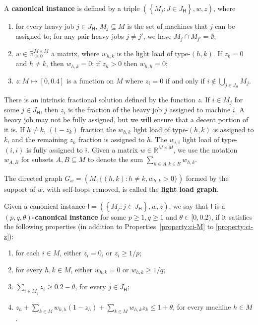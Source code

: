 \documentclass[11pt]{article}
\newenvironment{definition}{\begin{Definition}}{\end{Definition}}
\newtheorem{definition}[lemma]{Definition}
\newcounter{prop}
\newenvironment{properties}
{
\addtocounter{prop}{1}
\begin{enumerate}[labelindent=0pt,label=(\Alph{prop}\arabic*),itemindent=1em,itemsep=-1pt]
}
{
\end{enumerate}
}
\newcommand{\set}[1]{\left\{#1\right\}}
\newcommand{\R}{{\mathbb R}}
\newcommand{\cI}{{\mathsf I}}
\newcommand{\sfH}{{\mathsf H}}
\begin{document}
\begin{definition}
\label{def:ci-0}
A {\bf canonical instance} is defined by a triple $(\set{M_j: J \in J_\sfH}, w, z)$, where
\begin{properties}
\item for every heavy job $j \in J_\sfH$, $M_j \subseteq M$ is the set of machines that $j$ can be assigned to; for any pair heavy jobs $j \neq j'$, we have $M_j \cap M_{j'} = \emptyset$; \label{property:ci-M}
\item $w \!\in\! \R_{\geq 0}^{M \times M}$ a matrix, where  $w_{h,k}$ is the light load of type-$(h,k)$. If $z_k = 0$ and $h \neq k$, then $w_{h,k} \!= \!0$; if $z_h > 0$ then $w_{h, h} = 0$;  \label{property:ci-w}
\item $z:M \mapsto [0, 0.4]$ is a function on $M$ where $z_i = 0$ if and only if $i \notin \bigcup_{j \in J_\sfH}M_j$. \label{property:ci-z}
 \end{properties}
\end{definition}
\noindent
There is an intrinsic fractional solution defined by the function $z$. If $i \in M_j$ for some $j \in J_\sfH$, then $z_i$ is the fraction of the heavy job $j$ assigned to machine $i$. A heavy job may not be fully assigned, but we will ensure that a decent portion of it is.  If $h\!\neq\! k$, $(1\!-\!z_k)$ fraction the $w_{h,k}$ light load of type-$(h, k)$ is assigned to $k$, and the remaining $z_k$ fraction is assigned to $h$.  The $w_{i,i}$ light load of type-$(i,i)$ is fully assigned to $i$.  
Given a matrix $w \in \R^{M \times M}$, we use the notation $w_{A,B}$ for subsets $A,B\subseteq M$ to denote the sum $\sum_{h\in A,k\in B} w_{h,k}$.   

\begin{definition}
The directed graph $G_w = (M, \{(h,k):h \neq k, w_{h,k} > 0\})$ formed by the support of $w$, with self-loops removed, is called the {\bf light load graph}.
\end{definition}

\begin{definition}
Given a canonical instance $\cI = \left(\set{M_j : j \in {J_\sfH}}, w, z\right)$, we say that $\cI$ is a {\bf $(p, q, \theta)$-canonical instance} for some $p \geq 1, q \geq 1$ and $\theta  \in [0, 0.2)$, if it satisfies the following properties (in addition to Properties~\ref{property:ci-M} to \ref{property:ci-z}):
\begin{properties}
\item for each $i \in M$, either $z_i = 0$, or $z_i \geq 1/p$; 
\label{property:canonical-instance-z-i-large}
\item for every $h, k \in M$, either $w_{h,k} = 0$ or $w_{h, k} \geq 1/q$;
\label{property:canonical-instance-light-load-large}
\item $\sum_{i\in M_j}z_i \geq 0.2 - \theta$, for every $j \in {J_\sfH}$;
\label{property:canonical-instance-big-job-covered}
\item $z_h + \sum_{k\in M}w_{k, h}(1-z_h) + \sum_{k \in M}w_{h,k}z_{k} \leq 1 + \theta$, for every machine $h \in M$.
\label{property:canonical-instance-load-small}
\end{properties}
\end{definition}
\end{document}
